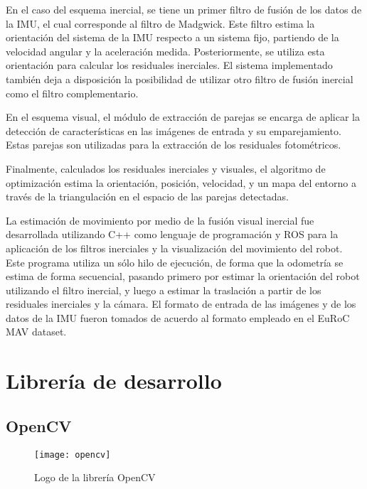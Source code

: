 En el caso del esquema inercial, se tiene un primer filtro de fusión de los datos de la IMU, el cual corresponde al filtro de Madgwick. Este filtro estima la orientación del sistema de la IMU respecto a un sistema fijo, partiendo de la velocidad angular y la aceleración medida. Posteriormente, se utiliza esta orientación para calcular los residuales inerciales. El sistema implementado también deja a disposición la posibilidad de utilizar otro filtro de fusión inercial como el filtro complementario.

En el esquema visual, el módulo de extracción de parejas se encarga de aplicar la detección de características en las imágenes de entrada y su emparejamiento. Estas parejas  son utilizadas para la extracción de los residuales fotométricos.

Finalmente, calculados los residuales inerciales y visuales,  el algoritmo de optimización estima la orientación, posición, velocidad, y un mapa del entorno a través de la triangulación en el espacio de las parejas detectadas.

La estimación de movimiento por medio de la fusión visual inercial fue desarrollada utilizando C++ como lenguaje de programación y ROS para la aplicación de los filtros inerciales y la visualización del movimiento del robot. Este programa utiliza un sólo hilo de ejecución, de forma que la odometría se estima de forma secuencial, pasando primero por estimar la orientación del robot utilizando el filtro inercial, y luego a estimar la traslación a partir de los residuales inerciales y la cámara. El formato de entrada de las imágenes y de los datos de la IMU fueron tomados de acuerdo al formato empleado en el EuRoC MAV dataset.



\section{Librería de desarrollo}

\subsection{OpenCV}

\begin{wrapfigure}{R}{5cm}
	\begin{center}
		\vspace*{-0.2in}
		\texttt{[image: opencv]}
	\end{center}
	\caption{Logo de la librería OpenCV}
\end{wrapfigure}

